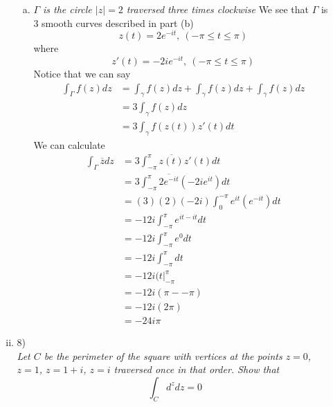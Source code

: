 \documentclass[11pt]{article}
\newcommand{\zbar}{\overline{z}}
\begin{document}
\begin{enumerate}
\begin{enumerate}[(i)]
\begin{enumerate}[(a)]
\item \textit{$\Gamma$ is the circle $|z|=2$ traversed three times clockwise}
We see that $\Gamma$ is 3 smooth curves described in part (b)
$$z(t) = 2e^{-it},\ (-\pi\le t\le \pi)$$
where
$$z'(t) = -2ie^{-it},\ (-\pi\le t\le \pi)$$
Notice that we can say
\begin{align*}
\int_{\Gamma}f(z)dz &= \int_{\gamma} f(z)dz + \int_{\gamma} f(z)dz + \int_{\gamma} f(z)dz\\
&= 3\int_{\gamma} f(z)dz\\
&= 3\int_{\gamma} f(z(t))z'(t)dt
\end{align*}
We can calculate
\begin{align*}
\int_{\Gamma} \zbar dz &= 3\int_{-\pi}^{\pi} \overline{z(t)}z'(t)dt\\
&= 3\int_{-\pi}^{\pi} \overline{2e^{-it}}\left(-2ie^{it}\right)dt\\
&= (3)(2)(-2i)\int_0^{-\pi} e^{it}\left(e^{-it}\right)dt\\
&= -12i\int_{-\pi}^{\pi} e^{it-it}dt\\
&= -12i\int_{-\pi}^{\pi} e^0dt\\
&= -12i\int_{-\pi}^{\pi} dt\\
&= -12i(t|_{-\pi}^{\pi}\\
&= -12i(\pi-{-\pi})\\
&= -12i(2\pi)\\
&= -24i\pi
\end{align*}
\end{enumerate}

\item 8)\\
\textit{Let $C$ be the perimeter of the square with vertices at the points $z=0$, $z=1$, $z=1+i$, $z=i$ traversed once in that order. Show that
$$\int_C d^z dz =0$$}


\end{enumerate}
\end{enumerate}
\end{document}
